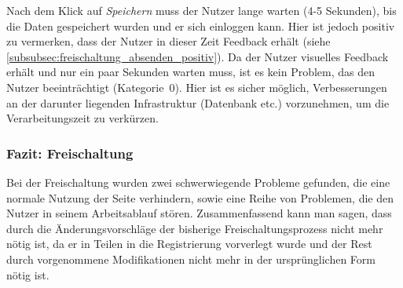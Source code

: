{
Nach dem Klick auf \emph{Speichern} muss der Nutzer lange warten (4-5 Sekunden), bis die Daten gespeichert wurden und er sich einloggen kann. Hier ist jedoch positiv zu vermerken, dass der Nutzer in dieser Zeit Feedback erhält (siehe \ref{subsubsec:freischaltung_absenden_positiv}).
}
{
Da der Nutzer visuelles Feedback erhält und nur ein paar Sekunden warten muss, ist es kein Problem, das den Nutzer beeinträchtigt (Kategorie~0).
}
{
Hier ist es sicher möglich, Verbesserungen an der darunter liegenden Infrastruktur (Datenbank etc.) vorzunehmen, um die Verarbeitungszeit zu verkürzen.
}
\label{prob:frei:speichern}

\subsubsection*{Fazit: Freischaltung}
Bei der Freischaltung wurden zwei schwerwiegende Probleme gefunden, die eine normale Nutzung der Seite verhindern, sowie eine Reihe von Problemen, die den Nutzer in seinem Arbeitsablauf stören. Zusammenfassend kann man sagen, dass durch die Änderungsvorschläge der bisherige Freischaltungsprozess nicht mehr nötig ist, da er in Teilen in die Registrierung vorverlegt wurde und der Rest durch vorgenommene Modifikationen nicht mehr in der ursprünglichen Form nötig ist.